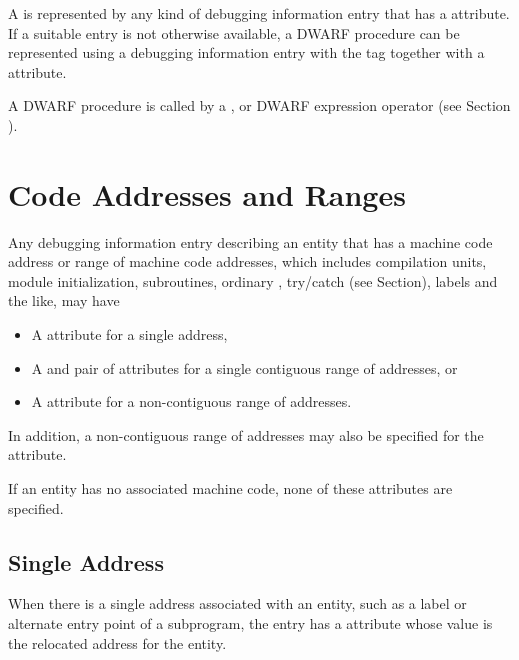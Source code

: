 A 
is represented by any
kind of debugging information entry that has 
a 
\DWATlocation{}
attribute. 
If a suitable entry is not otherwise available,
a DWARF procedure can be represented using a debugging
information entry with the 
tag \DWTAGdwarfprocedureTARG{}
together with 
a \DWATlocation{} attribute.  

A DWARF procedure
is called by a \DWOPcalltwo, 
\DWOPcallfour{} or 
\DWOPcallref{}
DWARF expression operator 
(see Section ).

\section{Code Addresses and Ranges}
\label{chap:codeaddressesandranges}
Any debugging information entry describing an entity that has
a machine code address or range of machine code addresses,
which includes compilation units, module initialization,
\hypertarget{chap:DWATrangesnoncontiguousrangeofcodeaddresses}{}
subroutines, ordinary , 
try/catch  (see Section), 
labels and the like, may have
\begin{itemize}
\item A \DWATlowpc{} attribute for
\hypertarget{chap:DWATlowpccodeaddressorrangeofaddresses}{}
a single address,

\item A \DWATlowpc{}
and 
\DWAThighpc{}
\hypertarget{chap:DWAThighpccontiguousrangeofcodeaddresses}{}
pair of attributes for 
a single contiguous range of
addresses, or

\item A \DWATranges{} attribute 
for a non-contiguous range of addresses.
\end{itemize}

In addition, a non-contiguous range of 
addresses may also be specified for the
\DWATstartscope{} attribute.

If an entity has no associated machine code, 
none of these attributes are specified.

\subsection{Single Address} 
When there is a single address associated with an entity,
such as a label or alternate entry point of a subprogram,
the entry has a \DWATlowpc{} attribute whose value is the
relocated address for the entity.

